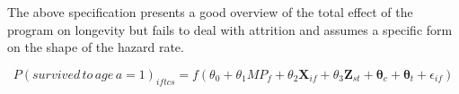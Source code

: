 The above specification presents a good overview of the total effect of the program on longevity but fails to deal with attrition and assumes a specific form on the shape of the hazard rate.

$$
P(survived\,to\,age\,a=1)_{iftcs} = f(\theta_0 + \theta_1MP_f + \theta_2\mathbf{X}_{if} + \theta_3\mathbf{Z}_{st} + \mathbf{\theta}_c + \mathbf{\theta}_t + \epsilon_{if})
$$